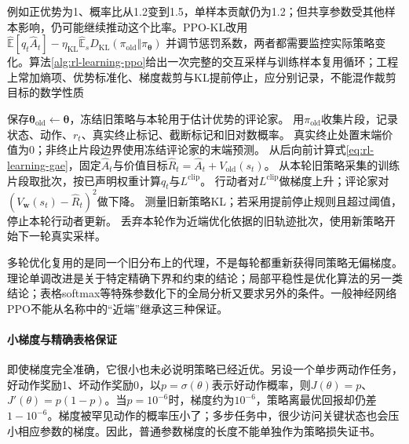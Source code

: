 例如正优势为1、概率比从1.2变到1.5，单样本贡献仍为1.2；但共享参数受其他样本影响，仍可能继续推动这个比率。PPO-KL改用
$\widehat{\mathbb E}[q_t\widehat A_t]
-\eta_{\mathrm{KL}}\widehat{\mathbb E}_sD_{\mathrm{KL}}
(\pi_{\mathrm{old}}\Vert\pi_{\bm\theta})$
并调节惩罚系数，两者都需要监控实际策略变化。算法\ref{alg:rl-learning-ppo}给出一次完整的交互采样与训练样本复用循环；工程上常加熵项、优势标准化、梯度裁剪与KL提前停止，应分别记录，不能混作裁剪目标的数学性质

\begin{algorithm}
  \label{alg:rl-learning-ppo}
  \begin{algorithmic}[1]
    \State 保存$\bm\theta_{\mathrm{old}}\gets\bm\theta$，冻结旧策略与本轮用于估计优势的评论家。
    \State 用$\pi_{\mathrm{old}}$收集片段，记录状态、动作、$r_t$、真实终止标记、截断标记和旧对数概率。
    \State 真实终止处置末端价值为0；非终止片段边界使用冻结评论家的末端预测。
    \State 从后向前计算式\eqref{eq:rl-learning-gae}，固定$\widehat A_t$与价值目标$\widehat R_t=\widehat A_t+V_{\mathrm{old}}(s_t)$。
      \State 从本轮旧策略采集的训练片段取批次，按已声明权重计算$q_t$与$L^{\mathrm{clip}}$。
      \State 行动者对$L^{\mathrm{clip}}$做梯度上升；评论家对$(V_{\bm w}(s_t)-\widehat R_t)^2$做下降。
      \State 测量旧新策略KL；若采用提前停止规则且超过阈值，停止本轮行动者更新。
    \EndFor
    \State 丢弃本轮作为近端优化依据的旧轨迹批次，使用新策略开始下一轮真实采样。
  \end{algorithmic}
\end{algorithm}

多轮优化复用的是同一个旧分布上的代理，不是每轮都重新获得同策略无偏梯度。理论单调改进是关于特定精确下界和约束的结论；局部平稳性是优化算法的另一类结论；表格softmax等特殊参数化下的全局分析又要求另外的条件。一般神经网络PPO不能从名称中的“近端”继承这三种保证。

\paragraph{小梯度与精确表格保证}
\label{sec:rl-learning-tabular-policy-optimization}
即使梯度完全准确，它很小也未必说明策略已经近优。另设一个单步两动作任务，好动作奖励1、坏动作奖励0，以$p=\sigma(\theta)$表示好动作概率，则$J(\theta)=p$、$J'(\theta)=p(1-p)$。当$p=10^{-6}$时，梯度约为$10^{-6}$，策略离最优回报却仍差$1-10^{-6}$。梯度被罕见动作的概率压小了；多步任务中，很少访问关键状态也会压小相应参数的梯度。因此，普通参数梯度的长度不能单独作为策略损失证书。

